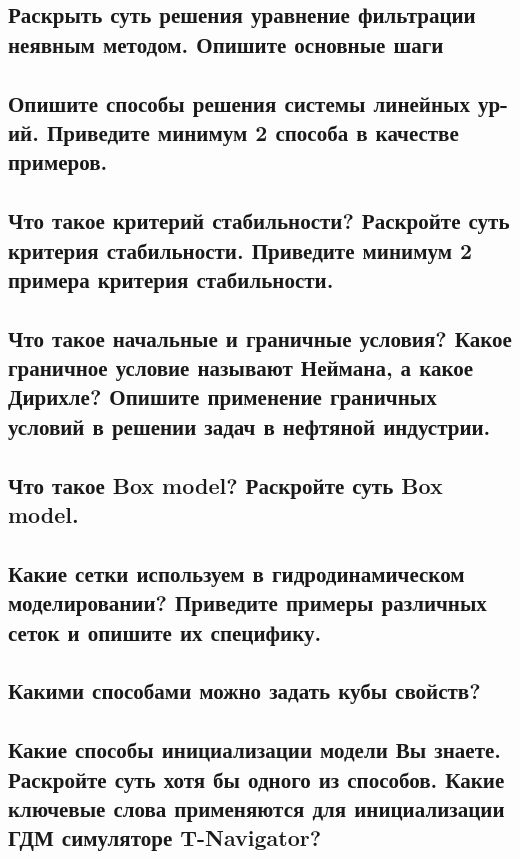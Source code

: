 \documentclass[main.tex]{subfiles}
\begin{document}
\newpage

\subsection{Раскрыть суть решения уравнение фильтрации неявным методом. Опишите основные шаги}

\newpage

\subsection{Опишите способы решения системы линейных ур-ий. Приведите минимум 2 способа в качестве примеров.}

\newpage

\subsection{Что такое критерий стабильности? Раскройте суть критерия стабильности. Приведите минимум 2 примера критерия стабильности.}

\newpage

\subsection{Что такое начальные и граничные условия? Какое граничное условие называют Неймана, а какое Дирихле? Опишите применение граничных условий в решении задач в нефтяной индустрии.}

\newpage

\subsection{Что такое Box model? Раскройте суть Box model.}

\newpage

\subsection{Какие сетки используем в гидродинамическом моделировании? Приведите примеры различных сеток и опишите их специфику.}

\newpage

\subsection{Какими способами можно задать кубы свойств?}

\newpage

\subsection{Какие способы инициализации модели Вы знаете. Раскройте суть хотя бы одного из способов. Какие ключевые слова применяются для инициализации ГДМ симуляторе T-Navigator?}
\end{document}
